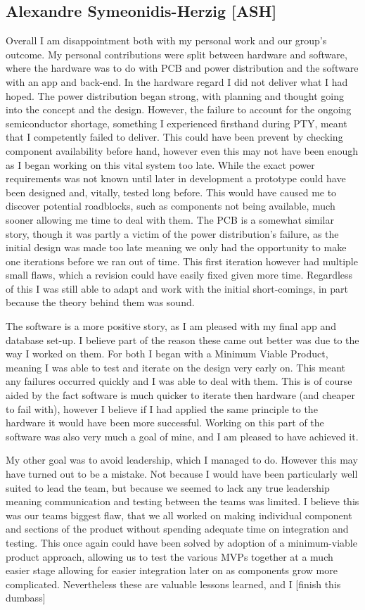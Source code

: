 \subsection{Alexandre Symeonidis-Herzig [ASH]}
Overall I am disappointment both with my personal work and our group's outcome.
My personal contributions were split between hardware and software, where the hardware was to do with PCB and power distribution and the software with an app and back-end.
In the hardware regard I did not deliver what I had hoped.
The power distribution began strong, with planning and thought going into the concept and the design.
However, the failure to account for the ongoing semiconductor shortage, something I experienced firsthand during PTY, meant that I competently failed to deliver.
This could have been prevent by checking component availability before hand, however even this may not have been enough as I began working on this vital system too late.
While the exact power requirements was not known until later in development a prototype could have been designed and, vitally, tested long before.
This would have caused me to discover potential roadblocks, such as components not being available, much sooner allowing me time to deal with them.
The PCB is a somewhat similar story, though it was partly a victim of the power distribution's failure, as the initial design was made too late meaning we only had the opportunity to make one iterations before we ran out of time.
This first iteration however had multiple small flaws, which a revision could have easily fixed given more time.
Regardless of this I was still able to adapt and work with the initial short-comings, in part because the theory behind them was sound.

The software is a more positive story, as I am pleased with my final app and database set-up.
I believe part of the reason these came out better was due to the way I worked on them.
For both I began with a Minimum Viable Product, meaning I was able to test and iterate on the design very early on.
This meant any failures occurred quickly and I was able to deal with them.
This is of course aided by the fact software is much quicker to iterate then hardware (and cheaper to fail with), however I believe if I had applied the same principle to the hardware it would have been more successful.
Working on this part of the software was also very much a goal of mine, and I am pleased to have achieved it.

My other goal was to avoid leadership, which I managed to do.
However this may have turned out to be a mistake.
Not because I would have been particularly well suited to lead the team, but because we seemed to lack any true leadership meaning communication and testing between the teams was limited.
I believe this was our teams biggest flaw, that we all worked on making individual component and sections of the product without spending adequate time on integration and testing.
This once again could have been solved by adoption of a minimum-viable product approach, allowing us to test the various MVPs together at a much easier stage allowing for easier integration later on as components grow more complicated.
Nevertheless these are valuable lessons learned, and I [finish this dumbass]


